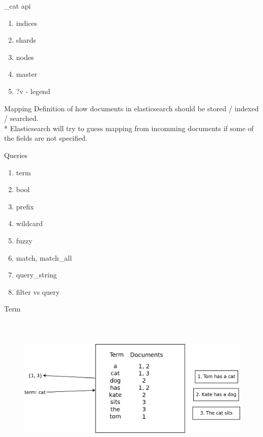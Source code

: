 \documentclass{beamer}
\begin{document}
\begin{frame}{\_cat api}
	\begin{enumerate}
		\item indices
		\item shards
		\item nodes
		\item master
		\item ?v - legend
	\end{enumerate}
\end{frame}
\begin{frame}{Mapping}
	Definition of how documents in elasticsearch should be stored / indexed / searched. \\*
	Elasticsearch will try to guess mapping from incomming documents if some of the fields are not specified.
\end{frame}
\begin{frame}{Queries}
	\begin{enumerate}
		\item term
		\item bool
		\item prefix
		\item wildcard
		\item fuzzy
		\item match, match\_all
		\item query\_string
		\item filter vs query
	\end{enumerate}
\end{frame}
\begin{frame}{Term}
	\begin{figure}
		\includegraphics[width=\textwidth,height=7cm,keepaspectratio=true]{term-query}
	\end{figure}
\end{frame}
\end{document}
